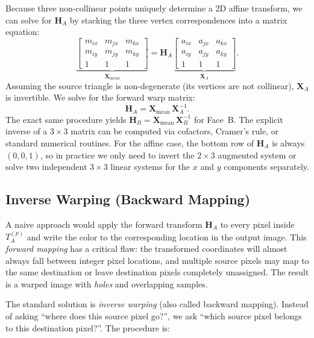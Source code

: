 Because three non-collinear points uniquely determine a 2D affine transform, we can solve for $\mathbf{H}_A$ by stacking the three vertex correspondences into a matrix equation:
\begin{equation}
    \underbrace{
    \begin{bmatrix}
        m_{ix} & m_{jx} & m_{kx} \\
        m_{iy} & m_{jy} & m_{ky} \\
        1 & 1 & 1
    \end{bmatrix}}_{\mathbf{X}_{\text{mean}}}
    =
    \mathbf{H}_A
    \underbrace{
    \begin{bmatrix}
        a_{ix} & a_{jx} & a_{kx} \\
        a_{iy} & a_{jy} & a_{ky} \\
        1 & 1 & 1
    \end{bmatrix}}_{\mathbf{X}_A}.
\end{equation}
Assuming the source triangle is non-degenerate (its vertices are not collinear), $\mathbf{X}_A$ is invertible. We solve for the forward warp matrix:
\begin{equation}
    \mathbf{H}_A = \mathbf{X}_{\text{mean}} \, \mathbf{X}_A^{-1}.
\end{equation}
The exact same procedure yields $\mathbf{H}_B = \mathbf{X}_{\text{mean}} \, \mathbf{X}_B^{-1}$ for Face~B. The explicit inverse of a $3 \times 3$ matrix can be computed via cofactors, Cramer's rule, or standard numerical routines. For the affine case, the bottom row of $\mathbf{H}_A$ is always $(0, 0, 1)$, so in practice we only need to invert the $2 \times 3$ augmented system or solve two independent $3 \times 3$ linear systems for the $x$ and $y$ components separately.

\subsection{Inverse Warping (Backward Mapping)}

A naive approach would apply the forward transform $\mathbf{H}_A$ to every pixel inside $T_A^{(p)}$ and write the color to the corresponding location in the output image. This \emph{forward mapping} has a critical flaw: the transformed coordinates will almost always fall between integer pixel locations, and multiple source pixels may map to the same destination or leave destination pixels completely unassigned. The result is a warped image with \emph{holes} and overlapping samples.

The standard solution is \emph{inverse warping} (also called backward mapping). Instead of asking ``where does this source pixel go?'', we ask ``which source pixel belongs to this destination pixel?''. The procedure is:

